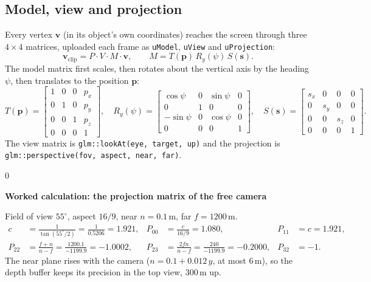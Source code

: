 \documentclass[11pt,a4paper]{article}
\newcommand{\code}[1]{\texttt{\small #1}}
\newenvironment{calc}[1]{\par\smallskip\noindent\begin{minipage}{\textwidth}\setlength{\fboxsep}{6pt}\begin{lrbox}{0}\begin{minipage}{0.955\textwidth}\textbf{Worked calculation: #1}\par\smallskip}{\end{minipage}\end{lrbox}\fbox{\usebox{0}}\end{minipage}\par\smallskip}
\begin{document}
\subsection{Model, view and projection}
Every vertex $\mathbf{v}$ (in its object's own coordinates) reaches the screen through three $4\times4$ matrices, uploaded each frame as \code{uModel}, \code{uView} and \code{uProjection}:
\[
\mathbf{v}_{\text{clip}} = P \cdot V \cdot M \cdot \mathbf{v}, \qquad M = T(\mathbf{p})\, R_y(\psi)\, S(\mathbf{s}).
\]
The model matrix first scales, then rotates about the vertical axis by the heading $\psi$, then translates to the position $\mathbf{p}$:
\[
T(\mathbf{p}) = \begin{bmatrix}1&0&0&p_x\\0&1&0&p_y\\0&0&1&p_z\\0&0&0&1\end{bmatrix},\quad
R_y(\psi) = \begin{bmatrix}\cos\psi&0&\sin\psi&0\\0&1&0&0\\-\sin\psi&0&\cos\psi&0\\0&0&0&1\end{bmatrix},\quad
S(\mathbf{s}) = \begin{bmatrix}s_x&0&0&0\\0&s_y&0&0\\0&0&s_z&0\\0&0&0&1\end{bmatrix}.
\]
The view matrix is \code{glm::lookAt(eye, target, up)} and the projection is \code{glm::perspective(fov, aspect, near, far)}.

\begin{calc}{the projection matrix of the free camera}
Field of view $55^\circ$, aspect $16/9$, near $n = 0.1$\,m, far $f = 1200$\,m.
\begin{align*}
c &= \frac{1}{\tan(55^\circ/2)} = \frac{1}{0.5206} = 1.921, &
P_{00} &= \frac{c}{16/9} = 1.080, & P_{11} &= c = 1.921,\\
P_{22} &= \frac{f+n}{n-f} = \frac{1200.1}{-1199.9} = -1.0002, &
P_{23} &= \frac{2fn}{n-f} = \frac{240}{-1199.9} = -0.2000, & P_{32} &= -1.
\end{align*}
The near plane rises with the camera ($n = 0.1 + 0.012\,y$, at most 6\,m), so the depth buffer keeps its precision in the top view, 300\,m up.
\end{calc}
\end{document}
